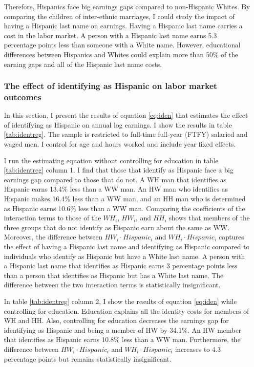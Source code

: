 \documentclass[12pt, fullpage]{article}
\begin{document}
Therefore, Hispanics face big earnings gaps compared to non-Hispanic Whites. By comparing the children of inter-ethnic marriages, I could study the impact of having a Hispanic last name on earnings. Having a Hispanic last name carries a cost in the labor market. A person with a Hispanic last name earns 5.3 percentage points less than someone with a White name. However, educational differences between Hispanics and Whites could explain more than 50\% of the earning gaps and all of the Hispanic last name costs.

\subsubsection{The effect of identifying as Hispanic on labor market outcomes}

In this section, I present the results of equation \ref{eq:iden} that estimates the effect of identifying as Hispanic on annual log earnings. I show the results in table \ref{tab:identreg}. The sample is restricted to full-time full-year (FTFY) salaried and waged men. I control for age and hours worked and include year fixed effects.

I run the estimating equation without controlling for education in table \ref{tab:identreg} column 1. I find that those that identify as Hispanic face a big earnings gap compared to those that do not. A WH man that identifies as Hispanic earns 13.4\% less than a WW man. An HW man who identifies as Hispanic makes 16.4\% less than a WW man, and an HH man who is determined as Hispanic earns 10.6\% less than a WW man. Comparing the coefficients of the interaction terms to those of the $WH_{i}$, $HW_{i}$, and $HH_{i}$ shows that members of the three groups that do not identify as Hispanic earn about the same as WW.
Moreover, the difference between $HW_{i} \cdot Hispanic_{i}$  and $WH_{i} \cdot Hispanic_{i}$ captures the effect of having a Hispanic last name and identifying as Hispanic compared to individuals who identify as Hispanic but have a White last name. A person with a Hispanic last name that identifies as Hispanic earns 3 percentage points less than a person that identifies as Hispanic but has a White last name. The difference between the two interaction terms is statistically insignificant.

In table  \ref{tab:identreg} column 2, I show the results of equation \ref{eq:iden} while controlling for education. Education explains all the identity costs for members of WH and HH. Also, controlling for education decreases the earnings gap for identifying as Hispanic and being a member of HW by 34.1\%. An HW member that identifies as Hispanic earns 10.8\% less than a WW man. Furthermore, the difference between $HW_{i} \cdot Hispanic_{i}$  and $WH_{i} \cdot Hispanic_{i}$ increases to 4.3 percentage points but remains statistically insignificant.
\end{document}
